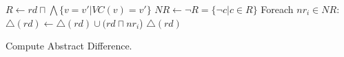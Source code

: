 \begin{algorithm}
\small
\DontPrintSemicolon
\SetAlgoLined
{}
$R \leftarrow rd \sqcap \bigwedge\{ v = v' | VC(v) = v'\}$\;
$NR \leftarrow \neg R = \{ \neg c | c \in R\}$\;
Foreach $nr_i \in NR$:
    $\triangle(rd) \leftarrow \triangle(rd) \cup (rd \sqcap nr_i$)\;
\Return $\triangle(rd)$
\caption{Compute Abstract Difference.}\label{Alg:AbsDiff}
\end{algorithm}
\setcounter{algocf}{1}
